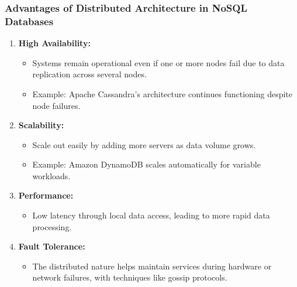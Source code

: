 \documentclass[aspectratio=169]{beamer}
\begin{document}
\begin{frame}[fragile]
    \frametitle{Advantages of Distributed Architecture in NoSQL Databases}
    \begin{enumerate}
        \item \textbf{High Availability:}
        \begin{itemize}
            \item Systems remain operational even if one or more nodes fail due to data replication across several nodes.
            \item Example: Apache Cassandra's architecture continues functioning despite node failures.
        \end{itemize}
        
        \item \textbf{Scalability:}
        \begin{itemize}
            \item Scale out easily by adding more servers as data volume grows.
            \item Example: Amazon DynamoDB scales automatically for variable workloads.
        \end{itemize}
        
        \item \textbf{Performance:}
        \begin{itemize}
            \item Low latency through local data access, leading to more rapid data processing.
        \end{itemize}
        
        \item \textbf{Fault Tolerance:}
        \begin{itemize}
            \item The distributed nature helps maintain services during hardware or network failures, with techniques like gossip protocols.
        \end{itemize}
    \end{enumerate}
\end{frame}
\end{document}
